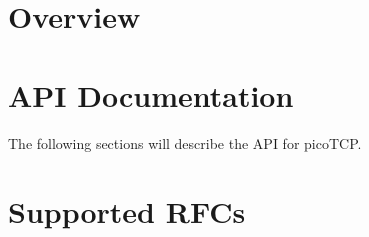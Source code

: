 

\tableofcontents

%

\chapter{Overview}
\label{chap:overview}



\chapter{API Documentation}
\label{chap:api_doc}
The following sections will describe the API for picoTCP.




















\appendix

%

\chapter{Supported RFCs}
\label{chap:rfcs}



